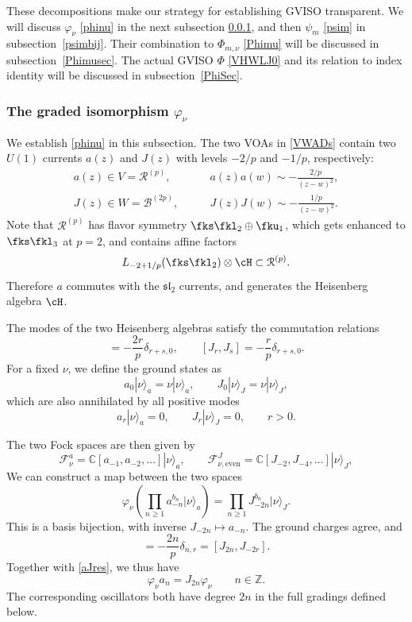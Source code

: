 \documentclass[a4paper,11pt]{article}
\theoremstyle{definition}
\theoremstyle{definition}
\theoremstyle{remark}
\newcommand{\be}{\begin{equation}}
\newcommand{\ee}{\end{equation}}
\newcommand{\C}{\mathbb C}
\newcommand{\Z}{\mathbb Z}
\begin{document}
These decompositions make  our strategy for establishing GVISO transparent. 
We will discuss $\varphi_\nu$   \eqref{phinu} in the next subsection \ref{phinusect}, and then      $\psi_m$  \eqref{psim} in subsection~\ref{psimbij}.
Their combination to  $\Phi_{m,\nu}$ \eqref{Phimu} will be discussed in subsection~\ref{Phimusec}. The actual GVISO  $\Phi$ \eqref{VHWLJ0} and its relation to index identity  will  be discussed in subsection~\ref{PhiSec}.

 



\subsubsection{The  graded isomorphism $\varphi_\nu$} \label{phinusect} 
We establish \eqref{phinu} in this subsection. The two VOAs in \eqref{VWADs}  contain two $U(1)$ currents $a(z)$ and $J(z)$ with levels $-2/p$ and $-1/p$, respectively:
\begin{align*}
a(z) \in V = \mathcal{R}^{(p)}, &\qquad a(z)a(w) \sim -\frac{2/p}{(z - w)^2}, \\[2mm]
J(z) \in W = \mathcal{B}^{(2p)}, &\qquad J(z)J(w) \sim -\frac{1/p}{(z - w)^2}.
\end{align*}
Note that $ \mathcal{R}^{(p)}$ has flavor symmetry $\fks\fkl_2\oplus \fku_1$, which gets enhanced to $\fks\fkl_3$ at $p=2$, and contains affine factors  \cite{Adamovic:2020lvj} 
\be\label{LHRp}
  L_{-2+1/p}(\fks\fkl_2)\otimes \cH \subset  \mathcal{R}^{(p)} .
\ee
Therefore $a$  commutes with the $\mathfrak{sl}_2$ currents, and generates   the Heisenberg algebra $\cH$.


The modes of the two Heisenberg algebras satisfy the commutation relations
\be
[a_r,a_s]=-\frac{2r}{p}\delta_{r+s,0},
\qquad [J_r,J_s]=-\frac r p\delta_{r+s,0}.
\label{eq:heis-brackets}
\ee
%
For a fixed $\nu$, we define the ground states as
\be\label{Ja0nu}
a_0|\nu\rangle_a=\nu|\nu\rangle_a,
\qquad J_0|\nu\rangle_J=\nu|\nu\rangle_J,
\ee
which are also annihilated by all positive modes
\be\label{aJres}
a_r|\nu\rangle_a=0, \qquad J_r|\nu\rangle_J=0, \qquad r>0.
\ee

The two Fock spaces are then given  by
\be\label{Fnufk}
\mathcal F_\nu^a=\C[a_{-1},a_{-2},\ldots]|\nu\rangle_a,
\qquad
\mathcal F_{\nu,\mathrm{even}}^J
=\C[J_{-2},J_{-4},\ldots]|\nu\rangle_J,
\ee
We can construct a map between the two spaces
\be
\varphi_\nu\!\left(\prod_{n\geq1}a_{-n}^{b_n}|\nu\rangle_a\right)
=\prod_{n\geq1}J_{-2n}^{b_n}|\nu\rangle_J.
\label{eq:varphi}
\ee
This is a basis bijection, with inverse $J_{-2n}\mapsto a_{-n}$.
The ground charges agree, and
\be
[a_n,a_{-r}]=-\frac{2n}{p}\delta_{n,r}
=[J_{2n},J_{-2r}].
\ee
Together with \eqref{aJres}, we thus have
\be
\varphi_\nu a_n=J_{2n}\varphi_\nu\qquad  n\in\Z .
\label{eq:varphi-modes}
\ee
The corresponding oscillators both have degree $2n$ in the
full gradings defined below.
\end{document}
